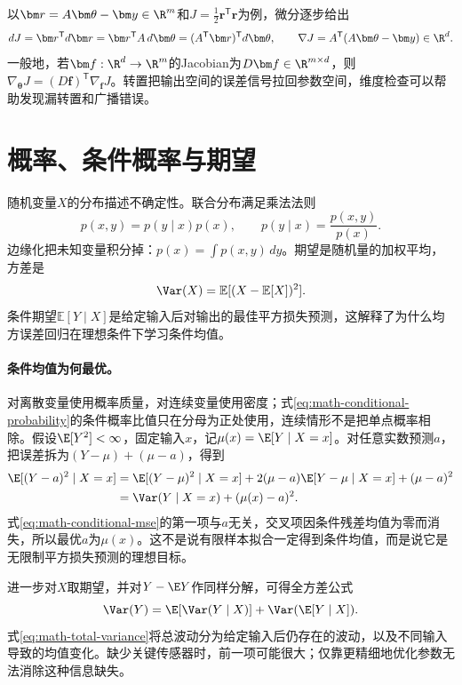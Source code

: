 以$\bm r=A\bm\theta-\bm y\in\R^m$和$J=\tfrac12\bm r^{\mathsf T}\bm r$为例，微分逐步给出
\begin{equation}
 dJ=\bm r^{\mathsf T}d\bm r
 =\bm r^{\mathsf T}A\,d\bm\theta
 =(A^{\mathsf T}\bm r)^{\mathsf T}d\bm\theta,
 \qquad \nabla J=A^{\mathsf T}(A\bm\theta-\bm y)\in\R^d.
\end{equation}
一般地，若$\bm f:\R^d\to\R^m$的Jacobian为$D\bm f\in\R^{m\times d}$，则$\nabla_{\bm\theta}J=(D\bm f)^{\mathsf T}\nabla_{\bm f}J$。转置把输出空间的误差信号拉回参数空间，维度检查可以帮助发现漏转置和广播错误。

\section{概率、条件概率与期望}
随机变量$X$的分布描述不确定性。联合分布满足乘法法则
\begin{equation}
 p(x,y)=p(y\mid x)p(x),
 \qquad p(y\mid x)=\frac{p(x,y)}{p(x)}.\label{eq:math-conditional-probability}
\end{equation}
边缘化把未知变量积分掉：$p(x)=\int p(x,y)\,dy$。期望是随机量的加权平均，方差是
\begin{equation}
 \Var(X)=\mathbb{E}[(X-\mathbb{E}[X])^2].
\end{equation}
条件期望$\mathbb{E}[Y\mid X]$是给定输入后对输出的最佳平方损失预测，这解释了为什么均方误差回归在理想条件下学习条件均值。

\paragraph{条件均值为何最优。}
对离散变量使用概率质量，对连续变量使用密度；式\eqref{eq:math-conditional-probability}的条件概率比值只在分母为正处使用，连续情形不是把单点概率相除。假设$\E[Y^2]<\infty$，固定输入$x$，记$\mu(x)=\E[Y\mid X=x]$。对任意实数预测$a$，把误差拆为$(Y-\mu)+(\mu-a)$，得到
\begin{align}
 \E[(Y-a)^2\mid X=x]
 &=\E[(Y-\mu)^2\mid X=x]
   +2(\mu-a)\E[Y-\mu\mid X=x]+(\mu-a)^2\\
 &=\Var(Y\mid X=x)+(\mu(x)-a)^2.\label{eq:math-conditional-mse}
\end{align}
式\eqref{eq:math-conditional-mse}的第一项与$a$无关，交叉项因条件残差均值为零而消失，所以最优$a$为$\mu(x)$。这不是说有限样本拟合一定得到条件均值，而是说它是无限制平方损失预测的理想目标。

进一步对$X$取期望，并对$Y-\E Y$作同样分解，可得全方差公式
\begin{equation}
 \Var(Y)=\E[\Var(Y\mid X)]+\Var(\E[Y\mid X]).\label{eq:math-total-variance}
\end{equation}
式\eqref{eq:math-total-variance}将总波动分为给定输入后仍存在的波动，以及不同输入导致的均值变化。缺少关键传感器时，前一项可能很大；仅靠更精细地优化参数无法消除这种信息缺失。

